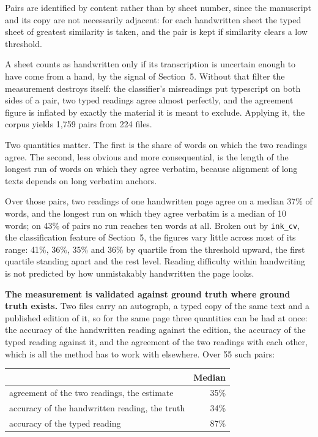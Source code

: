 \documentclass[11pt,a4paper]{article}
\begin{document}
Pairs are identified by content rather than by sheet number, since the
manuscript and its copy are not necessarily adjacent: for each handwritten
sheet the typed sheet of greatest similarity is taken, and the pair is kept if
similarity clears a low threshold.

A sheet counts as handwritten only if its transcription is uncertain enough to
have come from a hand, by the signal of Section~5. Without that filter the
measurement destroys itself: the classifier's misreadings put typescript on
both sides of a pair, two typed readings agree almost perfectly, and the
agreement figure is inflated by exactly the material it is meant to exclude.
Applying it, the corpus yields 1,759 pairs from 224 files.

Two quantities matter. The first is the share of words on which the two
readings agree. The second, less obvious and more consequential, is the length
of the longest run of words on which they agree verbatim, because alignment of
long texts depends on long verbatim anchors.

Over those pairs, two readings of one handwritten page agree on a median 37\%
of words, and the longest run on which they agree verbatim is a median of 10
words; on 43\% of pairs no run reaches ten words at all. Broken out by
\texttt{ink\_cv}, the classification feature of Section~5, the figures vary little
across most of its range: 41\%, 36\%, 35\% and 36\% by quartile from the threshold
upward, the first quartile standing apart and the rest level. Reading
difficulty within handwriting is not predicted by how unmistakably handwritten
the page looks.

\textbf{The measurement is validated against ground truth where ground truth
exists.} Two files carry an autograph, a typed copy of the same text and a
published edition of it, so for the same page three quantities can be had at
once: the accuracy of the handwritten reading against the edition, the
accuracy of the typed reading against it, and the agreement of the two
readings with each other, which is all the method has to work with elsewhere.
Over 55 such pairs:

\begin{longtable}[]{@{}lr@{}}
\toprule\noalign{}
& Median \\
\midrule\noalign{}
\endhead
\bottomrule\noalign{}
\endlastfoot
agreement of the two readings, the estimate & 35\% \\
accuracy of the handwritten reading, the truth & 34\% \\
accuracy of the typed reading & 87\% \\
\end{longtable}
\end{document}
